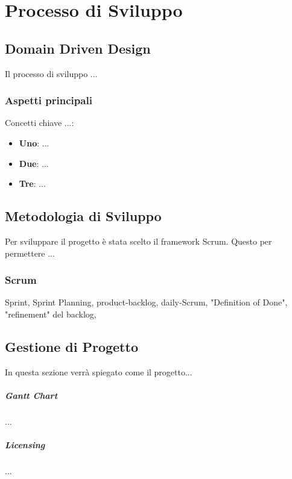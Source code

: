 \chapter{Processo di Sviluppo}

\section{Domain Driven Design}
Il processo di sviluppo ...
    \subsection{Aspetti principali}

    
    Concetti chiave ...:
    
        \begin{itemize}
        \item \textbf{Uno}: ...
        \item \textbf{Due}: ...
        \item \textbf{Tre}: ...
       
        
    \end{itemize}

 

\section{Metodologia di Sviluppo}
Per sviluppare il progetto è stata scelto il framework Scrum. Questo per permettere ... 
    \subsection{Scrum}
    Sprint, Sprint Planning,  product-backlog, daily-Scrum, "Definition of Done", "refinement" del backlog, 
    

\section{Gestione di Progetto}
In questa sezione verrà spiegato come il progetto...
    \paragraph{Gantt Chart} 
    ... 
    
    \paragraph{Licensing} 
    ...
    
